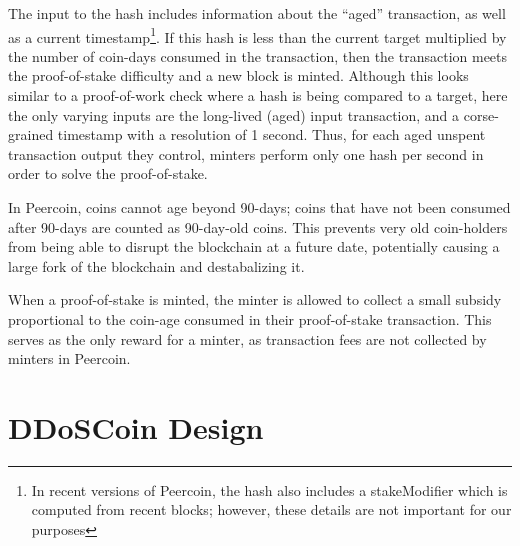 The input to the hash includes information about the ``aged'' transaction, as
well as a current timestamp\footnote{In recent versions of Peercoin, the hash
also includes a stakeModifier which is computed from recent blocks; however,
these details are not important for our purposes}. If this hash is less than the
current target multiplied by the number of coin-days consumed in the
transaction, then the transaction meets the proof-of-stake difficulty and a new
block is minted. Although this looks similar to a proof-of-work check where a
hash is being compared to a target, here the only varying inputs are the
long-lived (aged) input transaction, and a corse-grained timestamp with a
resolution of 1 second. Thus, for each aged unspent transaction output they
control, minters perform only one hash per second in order to solve the
proof-of-stake.

%



In Peercoin, coins cannot age beyond 90-days; coins that have not been consumed
after 90-days are counted as 90-day-old coins. This prevents very old
coin-holders from being able to disrupt the blockchain at a future date,
potentially causing a large fork of the blockchain and destabalizing it.

When a proof-of-stake is minted, the minter is allowed to collect a small
subsidy proportional to the coin-age consumed in their proof-of-stake
transaction. This serves as the only reward for a minter, as transaction fees are not
collected by minters in Peercoin.


\section{DDoSCoin Design}

